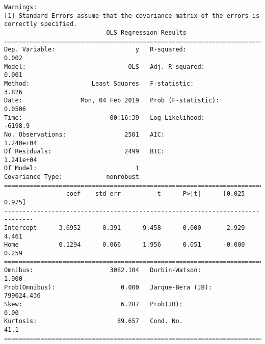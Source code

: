 \documentclass[11pt]{article}
\begin{document}
\begin{Verbatim}[commandchars=\\\{\}]
Warnings:
[1] Standard Errors assume that the covariance matrix of the errors is correctly specified.
                            OLS Regression Results                            
==============================================================================
Dep. Variable:                      y   R-squared:                       0.002
Model:                            OLS   Adj. R-squared:                  0.001
Method:                 Least Squares   F-statistic:                     3.826
Date:                Mon, 04 Feb 2019   Prob (F-statistic):             0.0506
Time:                        00:16:39   Log-Likelihood:                -6198.9
No. Observations:                2501   AIC:                         1.240e+04
Df Residuals:                    2499   BIC:                         1.241e+04
Df Model:                           1                                         
Covariance Type:            nonrobust                                         
==============================================================================
                 coef    std err          t      P>|t|      [0.025      0.975]
------------------------------------------------------------------------------
Intercept      3.6952      0.391      9.458      0.000       2.929       4.461
Home           0.1294      0.066      1.956      0.051      -0.000       0.259
==============================================================================
Omnibus:                     3082.104   Durbin-Watson:                   1.900
Prob(Omnibus):                  0.000   Jarque-Bera (JB):           799024.436
Skew:                           6.287   Prob(JB):                         0.00
Kurtosis:                      89.657   Cond. No.                         41.1
==============================================================================


\end{Verbatim}
\end{document}
